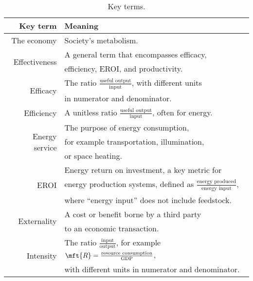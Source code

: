 {{    \begin{table}[h!]
    \caption[Key terms]{Key terms.}
    \centering
    \begin{tabular}{r l}
    \toprule
    Key term              & Meaning  \\ 
    \midrule  
    The economy           & Society's metabolism. \vspace{4mm} \\
%
\multirow{2}{*}{Effectiveness}  & A general term that encompasses efficacy, \\
                                & efficiency, EROI, and productivity. \vspace{4mm} \\
%
\multirow{2}{*}{Efficacy}   & The ratio $\frac{\text{useful output}}{\text{input}}$, with different units \\
                            & in numerator and denominator. \vspace{4mm} \\
%
Efficiency            & A unitless ratio $\frac{\text{useful output}}{\text{input}}$, often for energy. \vspace{4mm} \\
%
\multirow{3}{*}{Energy service}   & The purpose of energy consumption, \\
                                  & for example transportation, illumination, \\
                                  & or space heating. \vspace{4mm} \\
%
\multirow{3}{*}{EROI} & Energy return on investment, a key metric for \\
                      & energy production systems, defined as $\frac{\text{energy produced}}{\text{energy input}}$, \\
                      & where ``energy input'' does not include feedstock. \vspace{4mm} \\
%
\multirow{2}{*}{Externality}   & A cost or benefit borne by a third party \\ 
                               & to an economic transaction. \vspace{4mm} \\
%
\multirow{2}{*}{Intensity}  & The ratio $\frac{\text{input}}{\text{output}}$, for example
                              $\mft{R} = \frac{\text{resource consumption}}{\text{GDP}}$, \\
                            & with different units in numerator and denominator. \vspace{4mm} \\

\end{tabular}
\end{table}}}

